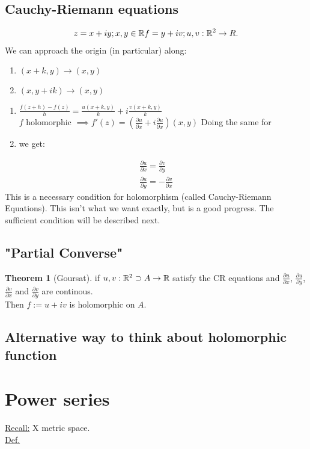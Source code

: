\documentclass[english, a4paper,12pt]{Iart}
\theoremstyle{plain} %
\theoremstyle{remark}
\theoremstyle{definition}
\newtheorem{theorem}{Theorem}
\begin{document}
\subsection{Cauchy-Riemann equations}
\begin{align*}
    z = x+iy; x,y \in \mathbb{R}
    f = y+iv; u,v: \mathbb{R}^2 \to R
.\end{align*}
We can approach the origin (in particular) along:
\begin{enumerate}
    \item $(x+k,y) \to (x,y)$
    \item $(x,y+ik) \to  (x,y)$
\end{enumerate}
\begin{enumerate}
    In \item $\frac{f(z+h)-f(z)}{h} = \frac{u(x+k,y)}{k} + i \frac{v(x+k,y)}{k}$\\
    $f$ holomorphic $\implies f'(z) = \left(\frac{\partial u}{\partial x} + i \frac{\partial u}{\partial x}\right)(x,y) $
    Doing the same for \item we get:
\end{enumerate}
\begin{align*}
    \frac{\partial u}{\partial x} = \frac{\partial v}{\partial y}\\
    \frac{\partial u}{\partial y} = - \frac{\partial v}{\partial x}  
\end{align*}
This is a necessary condition for holomorphism (called Cauchy-Riemann Equations). This isn't what we want exactly, but is a good progress. The sufficient condition will be described next.
\subsection{"Partial Converse"}
\begin{theorem}[Goursat]
    if $u,v: \mathbb{R}^2 \supset A \to \mathbb{R}$ satisfy the CR equations and $\frac{\partial u}{\partial x}$, $\frac{\partial u}{\partial y}$, $\frac{\partial v}{\partial x}$ and $\frac{\partial v}{\partial y}$ are continous.\\
    Then $ f := u +iv$ is holomorphic on $A$.
\end{theorem}

\subsection{Alternative way to think about holomorphic function}

\section{Power series}
\underline{Recall:} X metric space.\\
\underline{Def.}
\end{document}
